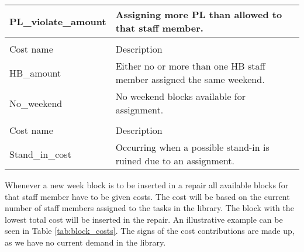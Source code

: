 \begin{table}[!h]
\begin{tabular}{|l|l|}
PL\_violate\_amount             & Assigning more PL than allowed to that staff member.                  \\ \hline
\rowcolor[HTML]{FD6864} 
\multicolumn{2}{|l|}{\cellcolor{corn} \textbf{Weekend costs}} \\ \hline
\rowcolor[HTML]{C0C0C0} 
Cost name                                      & Description       \\ \hline
HB\_amount                       & Either no or more than one HB staff member assigned the same weekend.   \\ \hline
No\_weekend                & No weekend blocks available for assignment.                  \\ \hline
\rowcolor[HTML]{FD6864} 
\multicolumn{2}{|l|}{\cellcolor{corn} \textbf{Stand-in costs}} \\ \hline
\rowcolor[HTML]{C0C0C0} 
Cost name                                      & Description       \\ \hline
Stand\_in\_cost                     & Occurring when a possible stand-in is ruined due to an assignment.    \\ \hline
\end{tabular}
\end{table}

Whenever a new week block is to be inserted in a repair all available blocks for that staff member have to be given costs. The cost will be based on the current number of staff members assigned to the tasks in the library. The block with the lowest total cost will be inserted in the repair. An illustrative example can be seen in Table \ref{tab:block_costs}. The signs of the cost contributions are made up, as we have no current demand in the library.


